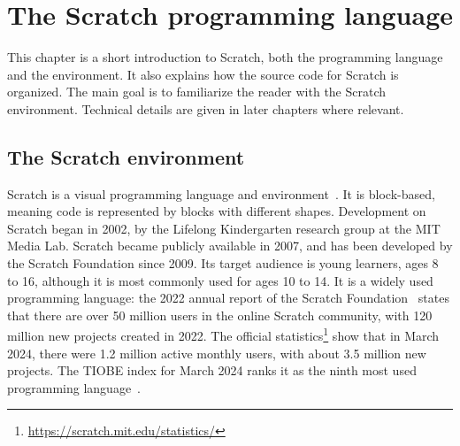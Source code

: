 \documentclass[../main]{subfiles}
\begin{document}
\chapter{The Scratch programming language}\label{ch:scratch-the-programming-language}


This chapter is a short introduction to Scratch, both the programming language and the environment.
It also explains how the source code for Scratch is organized.
The main goal is to familiarize the reader with the Scratch environment.
Technical details are given in later chapters where relevant.

\section{The Scratch environment}\label{sec:scratch-environment}


Scratch is a visual programming language and environment~\autocite{resnickScratchProgrammingAll2009}.
It is block-based, meaning code is represented by blocks with different shapes.
Development on Scratch began in 2002, by the Lifelong Kindergarten research group at the MIT Media Lab.
Scratch became publicly available in 2007, and has been developed by the Scratch Foundation since 2009.
Its target audience is young learners, ages 8 to 16, although it is most commonly used for ages 10 to 14.
It is a widely used programming language: the 2022 annual report of the Scratch Foundation~\autocite{scratchfoundationGrowingGlobalCreative2022} states that there are over 50 million users in the online Scratch community, with 120 million new projects created in 2022.
The official statistics\footnote{\url{https://scratch.mit.edu/statistics/}} show that in March 2024, there were 1.2 million active monthly users, with about 3.5 million new projects.
The TIOBE index for March 2024 ranks it as the ninth most used programming language~\autocite{tiobeTIOBEIndexMarch2024}.
\end{document}
